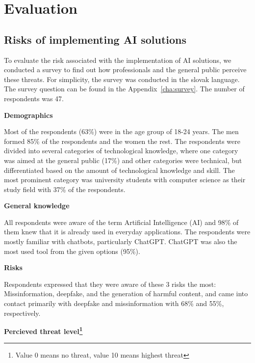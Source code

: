 \chapter{Evaluation \label{cha:eva}}



\section{Risks of implementing AI solutions \label{sec:eval_risks_survey}}
To evaluate the risk associated with the implementation of AI solutions, we conducted a survey to find out how professionals and the general public perceive these threats. For simplicity, the survey was conducted in the slovak language. The survey question can be found in the Appendix~\ref{cha:survey}. The number of respondents was 47.

\textbf{Demographics}

Most of the respondents (63\%) were in the age group of 18-24 years. The men formed 85\% of the respondents and the women the rest. The respondents were divided into several categories of technological knowledge, where one category was aimed at the general public (17\%) and other categories were technical, but differentiated based on the amount of technological knowledge and skill. The most prominent category was university students with computer science as their study field with 37\% of the respondents.

\textbf{General knowledge}

All respondents were aware of the term Artificial Intelligence (AI) and 98\% of them knew that it is already used in everyday applications. The respondents were mostly familiar with chatbots, particularly ChatGPT. ChatGPT was also the most used tool from the given options (95\%).

\textbf{Risks}

Respondents expressed that they were aware of these 3 risks the most: Missinformation, deepfake, and the generation of harmful content, and came into contact primarily with deepfake and missinformation with 68\% and 55\%, respectively.

\textbf{Percieved threat level\footnote{Value 0 means no threat, value 10 means highest threat}}

